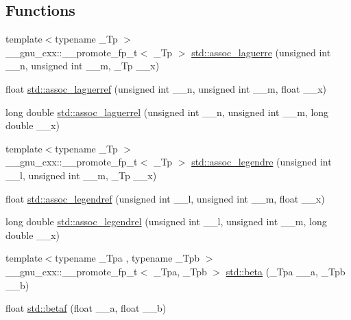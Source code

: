 \subsection*{Functions}
\begin{DoxyCompactItemize}
\item 
{\footnotesize template$<$typename \+\_\+\+Tp $>$ }\\\+\_\+\+\_\+gnu\+\_\+cxx\+::\+\_\+\+\_\+promote\+\_\+fp\+\_\+t$<$ \+\_\+\+Tp $>$ \hyperlink{group__tr29124__math__spec__func_ga87158c36cc84c104a3b23582829d8831}{std\+::assoc\+\_\+laguerre} (unsigned int \+\_\+\+\_\+n, unsigned int \+\_\+\+\_\+m, \+\_\+\+Tp \+\_\+\+\_\+x)
\item 
float \hyperlink{group__tr29124__math__spec__func_gaf83d98f350a1cfcebee6a1f723cf90d2}{std\+::assoc\+\_\+laguerref} (unsigned int \+\_\+\+\_\+n, unsigned int \+\_\+\+\_\+m, float \+\_\+\+\_\+x)
\item 
long double \hyperlink{group__tr29124__math__spec__func_gac8e245671fb2df5de5fd978d03081f6c}{std\+::assoc\+\_\+laguerrel} (unsigned int \+\_\+\+\_\+n, unsigned int \+\_\+\+\_\+m, long double \+\_\+\+\_\+x)
\item 
{\footnotesize template$<$typename \+\_\+\+Tp $>$ }\\\+\_\+\+\_\+gnu\+\_\+cxx\+::\+\_\+\+\_\+promote\+\_\+fp\+\_\+t$<$ \+\_\+\+Tp $>$ \hyperlink{group__tr29124__math__spec__func_ga9df2525c1155eb8539e85323f18361a3}{std\+::assoc\+\_\+legendre} (unsigned int \+\_\+\+\_\+l, unsigned int \+\_\+\+\_\+m, \+\_\+\+Tp \+\_\+\+\_\+x)
\item 
float \hyperlink{group__tr29124__math__spec__func_ga3ced07ddd24bf4af56e2712d148e7f57}{std\+::assoc\+\_\+legendref} (unsigned int \+\_\+\+\_\+l, unsigned int \+\_\+\+\_\+m, float \+\_\+\+\_\+x)
\item 
long double \hyperlink{group__tr29124__math__spec__func_ga55977b425a539146f060dec1c8003344}{std\+::assoc\+\_\+legendrel} (unsigned int \+\_\+\+\_\+l, unsigned int \+\_\+\+\_\+m, long double \+\_\+\+\_\+x)
\item 
{\footnotesize template$<$typename \+\_\+\+Tpa , typename \+\_\+\+Tpb $>$ }\\\+\_\+\+\_\+gnu\+\_\+cxx\+::\+\_\+\+\_\+promote\+\_\+fp\+\_\+t$<$ \+\_\+\+Tpa, \+\_\+\+Tpb $>$ \hyperlink{group__tr29124__math__spec__func_gaffed6cf5d5e3daf3e2c3a936bc0a33e7}{std\+::beta} (\+\_\+\+Tpa \+\_\+\+\_\+a, \+\_\+\+Tpb \+\_\+\+\_\+b)
\item 
float \hyperlink{group__tr29124__math__spec__func_ga12dc61ee4c09172151cf092ed387e203}{std\+::betaf} (float \+\_\+\+\_\+a, float \+\_\+\+\_\+b)

\end{DoxyCompactItemize}
